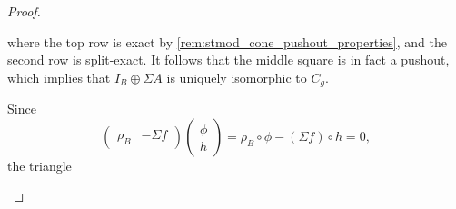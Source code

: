 \begin{proof}
\begin{enumerate}[label={(\bfseries TR\arabic*)}]
{\begin{center}
            \end{center}
            where the top row is exact by \autoref{rem:stmod_cone_pushout_properties}, and the second row is split-exact. It follows that the middle square is in fact a pushout, which implies that \( I_B \oplus \Sigma A  \) is uniquely isomorphic to \( C_g \).
            
            Since
            \[
                \begin{pmatrix}
                    \rho_B & -\Sigma f
                \end{pmatrix}
                \begin{pmatrix}
                    \phi \\
                    h
                \end{pmatrix}
                =
                \rho_B \circ \phi - (\Sigma f) \circ h = 0,
            \]
            the triangle
            \begin{center}
\end{center}}
\end{enumerate}
\end{proof}
